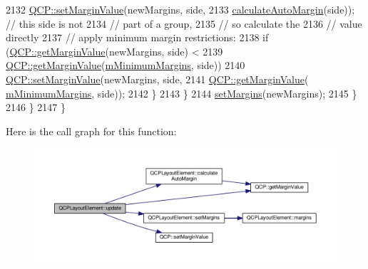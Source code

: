 \begin{DoxyCode}
2132             \hyperlink{namespace_q_c_p_afbf6e3084c108f2bb4372107945ee82f}{QCP::setMarginValue}(newMargins, side,
2133                                 \hyperlink{class_q_c_p_layout_element_a005c9f0fe84bc1591a2cf2c46fd477b4}{calculateAutoMargin}(side)); \textcolor{comment}{// this side is not}
2134                                                             \textcolor{comment}{// part of a group,}
2135                                                             \textcolor{comment}{// so calculate the}
2136                                                             \textcolor{comment}{// value directly}
2137           \textcolor{comment}{// apply minimum margin restrictions:}
2138           \textcolor{keywordflow}{if} (\hyperlink{namespace_q_c_p_a23a2679d3495c444acc26acc61e35b5b}{QCP::getMarginValue}(newMargins, side) <
2139               \hyperlink{namespace_q_c_p_a23a2679d3495c444acc26acc61e35b5b}{QCP::getMarginValue}(\hyperlink{class_q_c_p_layout_element_a5ba71f25d1af4bb092b28df618538e63}{mMinimumMargins}, side))
2140             \hyperlink{namespace_q_c_p_afbf6e3084c108f2bb4372107945ee82f}{QCP::setMarginValue}(newMargins, side,
2141                                 \hyperlink{namespace_q_c_p_a23a2679d3495c444acc26acc61e35b5b}{QCP::getMarginValue}(
      \hyperlink{class_q_c_p_layout_element_a5ba71f25d1af4bb092b28df618538e63}{mMinimumMargins}, side));
2142         \}
2143       \}
2144       \hyperlink{class_q_c_p_layout_element_a8f450b1f3f992ad576fce2c63d8b79cf}{setMargins}(newMargins);
2145     \}
2146   \}
2147 \}
\end{DoxyCode}


Here is the call graph for this function\+:\nopagebreak
\begin{figure}[H]
\begin{center}
\leavevmode
\includegraphics[width=350pt]{class_q_c_p_layout_element_a929c2ec62e0e0e1d8418eaa802e2af9b_cgraph}
\end{center}
\end{figure}




